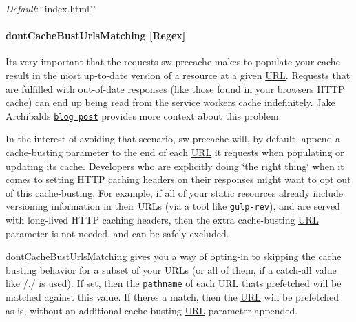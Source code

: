 {\itshape Default}\+: `\textquotesingle{}index.\+html'\`{}

\paragraph*{dont\+Cache\+Bust\+Urls\+Matching \mbox{[}Regex\mbox{]}}

It\textquotesingle{}s very important that the requests {\ttfamily sw-\/precache} makes to populate your cache result in the most up-\/to-\/date version of a resource at a given \mbox{\hyperlink{namespace_u_r_l}{U\+RL}}. Requests that are fulfilled with out-\/of-\/date responses (like those found in your browser\textquotesingle{}s H\+T\+TP cache) can end up being read from the service worker\textquotesingle{}s cache indefinitely. Jake Archibald\textquotesingle{}s \href{https://jakearchibald.com/2016/caching-best-practices/#a-service-worker-can-extend-the-life-of-these-bugs}{\tt blog post} provides more context about this problem.

In the interest of avoiding that scenario, {\ttfamily sw-\/precache} will, by default, append a cache-\/busting parameter to the end of each \mbox{\hyperlink{namespace_u_r_l}{U\+RL}} it requests when populating or updating its cache. Developers who are explicitly doing \char`\"{}the right
thing\char`\"{} when it comes to setting H\+T\+TP caching headers on their responses might want to opt out of this cache-\/busting. For example, if all of your static resources already include versioning information in their U\+R\+Ls (via a tool like \href{https://github.com/sindresorhus/gulp-rev}{\tt {\ttfamily gulp-\/rev}}), and are served with long-\/lived H\+T\+TP caching headers, then the extra cache-\/busting \mbox{\hyperlink{namespace_u_r_l}{U\+RL}} parameter is not needed, and can be safely excluded.

{\ttfamily dont\+Cache\+Bust\+Urls\+Matching} gives you a way of opting-\/in to skipping the cache busting behavior for a subset of your U\+R\+Ls (or all of them, if a catch-\/all value like {\ttfamily /./} is used). If set, then the \href{https://developer.mozilla.org/en-US/docs/Web/API/HTMLHyperlinkElementUtils/pathname}{\tt pathname} of each \mbox{\hyperlink{namespace_u_r_l}{U\+RL}} that\textquotesingle{}s prefetched will be matched against this value. If there\textquotesingle{}s a match, then the \mbox{\hyperlink{namespace_u_r_l}{U\+RL}} will be prefetched as-\/is, without an additional cache-\/busting \mbox{\hyperlink{namespace_u_r_l}{U\+RL}} parameter appended.

